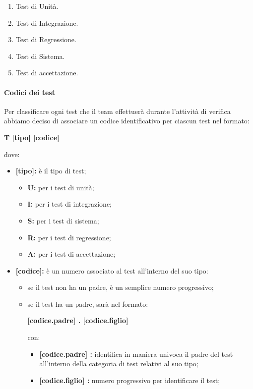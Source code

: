 \begin{enumerate}
    \item Test di Unità.
    \item Test di Integrazione.
    \item Test di Regressione.
    \item Test di Sistema.
    \item Test di accettazione. 
\end{enumerate}

\paragraph{Codici dei test}
Per classificare ogni test che il team effettuerà durante l'attività di verifica abbiamo deciso di associare un codice identificativo per ciascun test nel formato: 

\begin{center}
    \textbf{T [tipo] [codice]}
\end{center}

dove:

\begin{itemize}
    \item \textbf{[tipo]:} 
        è il tipo di test;
        \begin{itemize}
            \item \textbf{U:} 
                per i test di unità;
            \item \textbf{I:} 
                per i test di integrazione; 
            \item \textbf{S:} 
                per i test di sistema; 
            \item \textbf{R:} 
                per i test di regressione;
            \item\textbf{A:} 
                per i test di accettazione;
        \end{itemize}
    \item \textbf{[codice]:} 
        è un numero associato al test all'interno del suo tipo: 
        \begin{itemize}
            \item 
                se il test non ha un padre, è un semplice numero progressivo;
            \item 
                se il test ha un padre, sarà nel formato:
                \begin{center}
                    \textbf{[codice.padre] . [codice.figlio]} 
                \end{center}
                con:
                \begin{itemize}
                    \item \textbf{[codice.padre] :} 
                        identifica in maniera univoca il padre del test all'interno della categoria di test relativi al suo tipo;
                    \item \textbf{[codice.figlio] :} 
                        numero progressivo per identificare il test; 
                \end{itemize}
        \end{itemize}
\end{itemize}

